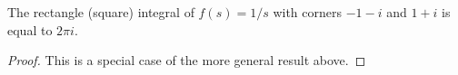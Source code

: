 \begin{lemma}[ResidueTheoremAtOrigin]
\label{ResidueTheoremAtOrigin}
\leanok
The rectangle (square) integral of $f(s) = 1/s$ with
  corners $-1-i$ and $1+i$ is equal to $2\pi i$.
\end{lemma}
\begin{proof}
\leanok
This is a special case of the more general result above.
\end{proof}
